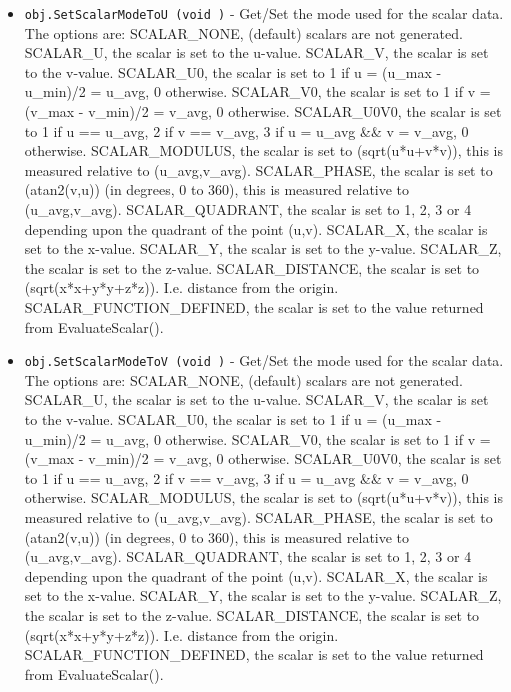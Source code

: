 \begin{itemize}
\item  \verb|obj.SetScalarModeToU (void )| -  Get/Set the mode used for the scalar data.  The options are:
 SCALAR\_NONE, (default) scalars are not generated.
 SCALAR\_U, the scalar is set to the u-value. 
 SCALAR\_V, the scalar is set to the v-value.
 SCALAR\_U0, the scalar is set to 1 if u = (u\_max - u\_min)/2 = u\_avg, 0 otherwise.
 SCALAR\_V0, the scalar is set to 1 if v = (v\_max - v\_min)/2 = v\_avg, 0 otherwise.
 SCALAR\_U0V0, the scalar is 
   set to 1 if u == u\_avg, 2 if v == v\_avg, 3 if u = u\_avg \&\& v = v\_avg, 0 otherwise.
 SCALAR\_MODULUS, the scalar is set to (sqrt(u*u+v*v)), this is measured relative to (u\_avg,v\_avg).
 SCALAR\_PHASE, the scalar is set to (atan2(v,u)) (in degrees, 0 to 360), this is measured relative to (u\_avg,v\_avg).
 SCALAR\_QUADRANT, the scalar is set to 1, 2, 3 or 4 
   depending upon the quadrant of the point (u,v).
 SCALAR\_X, the scalar is set to the x-value. 
 SCALAR\_Y, the scalar is set to the y-value. 
 SCALAR\_Z, the scalar is set to the z-value. 
 SCALAR\_DISTANCE, the scalar is set to (sqrt(x*x+y*y+z*z)). I.e. distance from the origin.
 SCALAR\_FUNCTION\_DEFINED, the scalar is set to the value returned from EvaluateScalar().

\item  \verb|obj.SetScalarModeToV (void )| -  Get/Set the mode used for the scalar data.  The options are:
 SCALAR\_NONE, (default) scalars are not generated.
 SCALAR\_U, the scalar is set to the u-value. 
 SCALAR\_V, the scalar is set to the v-value.
 SCALAR\_U0, the scalar is set to 1 if u = (u\_max - u\_min)/2 = u\_avg, 0 otherwise.
 SCALAR\_V0, the scalar is set to 1 if v = (v\_max - v\_min)/2 = v\_avg, 0 otherwise.
 SCALAR\_U0V0, the scalar is 
   set to 1 if u == u\_avg, 2 if v == v\_avg, 3 if u = u\_avg \&\& v = v\_avg, 0 otherwise.
 SCALAR\_MODULUS, the scalar is set to (sqrt(u*u+v*v)), this is measured relative to (u\_avg,v\_avg).
 SCALAR\_PHASE, the scalar is set to (atan2(v,u)) (in degrees, 0 to 360), this is measured relative to (u\_avg,v\_avg).
 SCALAR\_QUADRANT, the scalar is set to 1, 2, 3 or 4 
   depending upon the quadrant of the point (u,v).
 SCALAR\_X, the scalar is set to the x-value. 
 SCALAR\_Y, the scalar is set to the y-value. 
 SCALAR\_Z, the scalar is set to the z-value. 
 SCALAR\_DISTANCE, the scalar is set to (sqrt(x*x+y*y+z*z)). I.e. distance from the origin.
 SCALAR\_FUNCTION\_DEFINED, the scalar is set to the value returned from EvaluateScalar().


\end{itemize}

